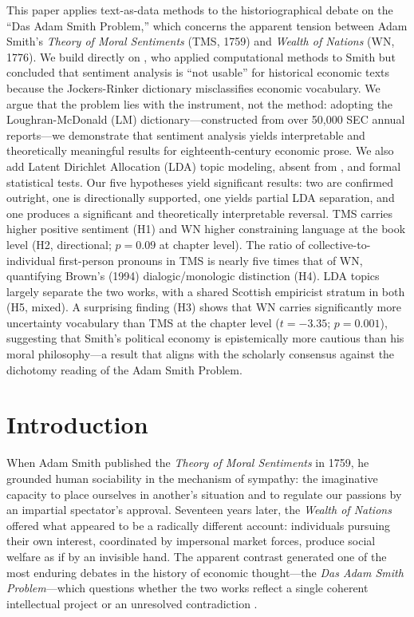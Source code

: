 \documentclass[12pt,a4paper]{article}
\begin{document}
\noindent
This paper applies text-as-data methods to the historiographical debate
on the ``Das Adam Smith Problem,'' which concerns the apparent tension
between Adam Smith's \textit{Theory of Moral Sentiments} (TMS, 1759)
and \textit{Wealth of Nations} (WN, 1776).
We build directly on \citet{Ballandonne2023}, who applied computational
methods to Smith but concluded that sentiment analysis is ``not usable''
for historical economic texts because the Jockers-Rinker dictionary
misclassifies economic vocabulary.
We argue that the problem lies with the instrument, not the method:
adopting the Loughran-McDonald (LM) dictionary---constructed from over
50,000 SEC annual reports---we demonstrate that sentiment analysis
yields interpretable and theoretically meaningful results for
eighteenth-century economic prose.
We also add Latent Dirichlet Allocation (LDA) topic modeling, absent
from \citeauthor{Ballandonne2023}, and formal statistical tests.
Our five hypotheses yield significant results: two are confirmed outright,
one is directionally supported, one yields partial LDA separation, and
one produces a significant and theoretically interpretable reversal.
TMS carries higher positive sentiment (H1) and WN higher constraining
language at the book level (H2, directional; $p = 0.09$ at chapter level).
The ratio of collective-to-individual first-person pronouns in TMS is
nearly five times that of WN, quantifying Brown's (1994)
dialogic/monologic distinction (H4).
LDA topics largely separate the two works, with a shared Scottish
empiricist stratum in both (H5, mixed).
A surprising finding (H3) shows that WN carries significantly more
uncertainty vocabulary than TMS at the chapter level
($t = -3.35$; $p = 0.001$), suggesting that Smith's
political economy is epistemically more cautious than his moral
philosophy---a result that aligns with the scholarly consensus
against the dichotomy reading of the Adam Smith Problem.

\newpage

\section{Introduction}

When Adam Smith published the \textit{Theory of Moral Sentiments} in
1759, he grounded human sociability in the mechanism of sympathy: the
imaginative capacity to place ourselves in another's situation and to
regulate our passions by an impartial spectator's approval.
Seventeen years later, the \textit{Wealth of Nations} offered what
appeared to be a radically different account: individuals pursuing their
own interest, coordinated by impersonal market forces, produce social
welfare as if by an invisible hand.
The apparent contrast generated one of the most enduring debates in the
history of economic thought---the \textit{Das Adam Smith Problem}---which
questions whether the two works reflect a single coherent intellectual
project or an unresolved contradiction
\citep{Montes2003}.
\end{document}
